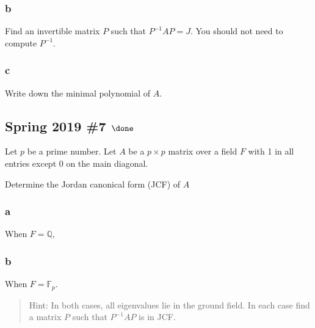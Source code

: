\hypertarget{b-99}{%
\subsubsection{b}\label{b-99}}

Find an invertible matrix \(P\) such that \(P^{-1}A P = J\). You should
not need to compute \(P^{-1}\).

\hypertarget{c-60}{%
\subsubsection{c}\label{c-60}}

Write down the minimal polynomial of \(A\).

\hypertarget{spring-2019-7-done}{%
\subsection{\texorpdfstring{Spring 2019 \#7
\(\done\)}{Spring 2019 \#7 \textbackslash done}}\label{spring-2019-7-done}}

Let \(p\) be a prime number. Let \(A\) be a \(p \times p\) matrix over a
field \(F\) with 1 in all entries except 0 on the main diagonal.

Determine the Jordan canonical form (JCF) of \(A\)

\hypertarget{a-110}{%
\subsubsection{a}\label{a-110}}

When \(F = {\mathbb{Q}}\),

\hypertarget{b-100}{%
\subsubsection{b}\label{b-100}}

When \(F = {\mathbb{F}}_p\).

\begin{quote}
Hint: In both cases, all eigenvalues lie in the ground field. In each
case find a matrix \(P\) such that \(P^{-1}AP\) is in JCF.
\end{quote}

